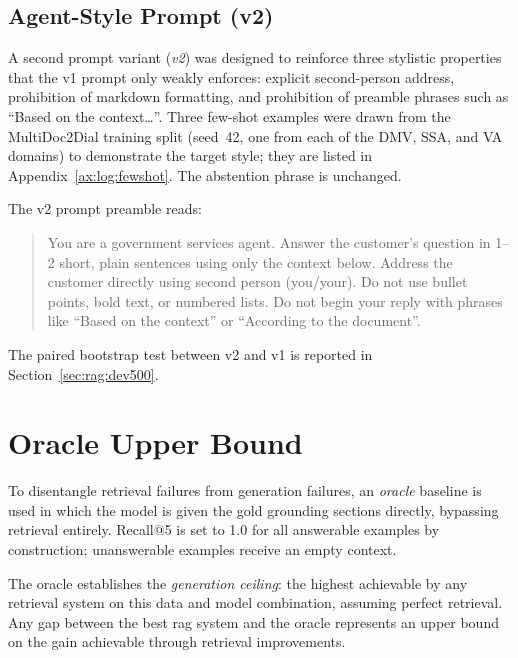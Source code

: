 \subsection{Agent-Style Prompt (v2)}\label{sec:rag:prompt}

A second prompt variant (\emph{v2}) was designed to reinforce three stylistic
properties that the v1 prompt only weakly enforces: explicit second-person address,
prohibition of markdown formatting, and prohibition of preamble phrases such as
``Based on the context\ldots''. Three few-shot examples were drawn from the
MultiDoc2Dial training split (seed~42, one from each of the DMV, SSA, and VA
domains) to demonstrate the target style; they are listed in
Appendix~\ref{ax:log:fewshot}. The abstention phrase is unchanged.

The v2 prompt preamble reads:

\begin{quote}
\small\ttfamily
You are a government services agent. Answer the customer's question in 1--2 short,
plain sentences using only the context below. Address the customer directly using
second person (you/your). Do not use bullet points, bold text, or numbered lists.
Do not begin your reply with phrases like ``Based on the context'' or ``According
to the document''.
\end{quote}

The paired bootstrap test between v2 and v1 is reported in
Section~\ref{sec:rag:dev500}.


\section{Oracle Upper Bound}\label{sec:rag:oracle}

To disentangle retrieval failures from generation failures, an \emph{oracle}
baseline is used in which the model is given the gold grounding sections
directly, bypassing retrieval entirely. Recall@5 is set to 1.0 for all answerable
examples by construction; unanswerable examples receive an empty context.

The oracle \fone{} establishes the \emph{generation ceiling}: the highest \fone{}
achievable by any retrieval system on this data and model combination, assuming
perfect retrieval. Any gap between the best \gls{rag} system and the oracle
represents an upper bound on the gain achievable through retrieval improvements.


